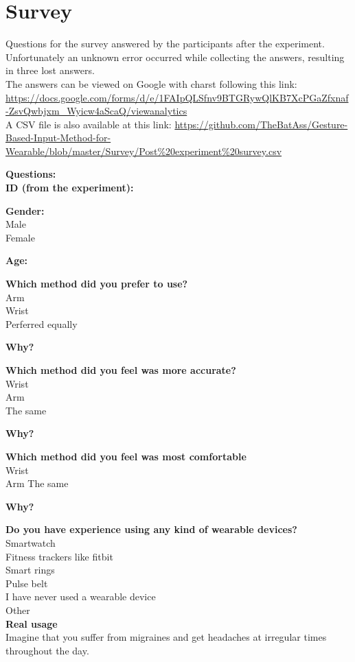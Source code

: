 \chapter{Survey}\label{survey}
Questions for the survey answered by the participants after the experiment. Unfortunately an unknown error occurred while collecting the answers, resulting in three lost answers.\\
The answers can be viewed on Google with charst following this link:\\
\url{https://docs.google.com/forms/d/e/1FAIpQLSfnv9BTGRywQlKB7XcPGaZfxnaf-ZsvQwbjxm_Wyicw4aScaQ/viewanalytics}\\
A CSV file is also available at this link:
\url{https://github.com/TheBatAss/Gesture-Based-Input-Method-for-Wearable/blob/master/Survey/Post\%20experiment\%20survey.csv}

\textbf{Questions:}\\
\textbf{ID (from the experiment):}

\textbf{Gender:}\\
Male\\
Female

\textbf{Age:}

\textbf{Which method did you prefer to use?}\\
Arm\\
Wrist\\
Perferred equally

\textbf{Why?}

\textbf{Which method did you feel was more accurate?}\\
Wrist\\
Arm\\
The same

\textbf{Why?}

\textbf{Which method did you feel was most comfortable}\\
Wrist\\
Arm
The same

\textbf{Why?}

\textbf{Do you have experience using any kind of wearable devices? }\\
Smartwatch\\
Fitness trackers like fitbit\\
Smart rings\\
Pulse belt\\
I have never used a wearable device\\
Other\\

\textbf{Real usage}\\
Imagine that you suffer from migraines and get headaches at irregular times throughout the day.

